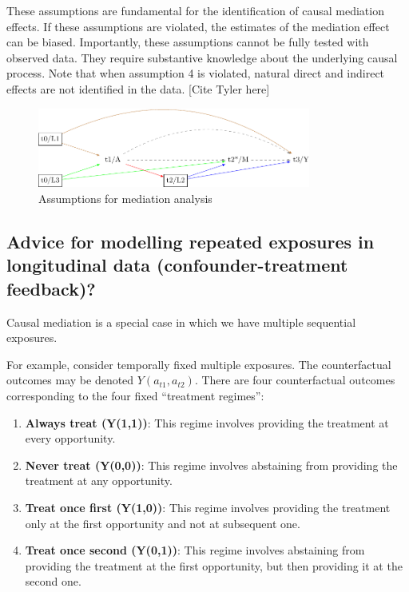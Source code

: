 \documentclass[
  singlecolumn]{report}
\begin{document}
These assumptions are fundamental for the identification of causal
mediation effects. If these assumptions are violated, the estimates of
the mediation effect can be biased. Importantly, these assumptions
cannot be fully tested with observed data. They require substantive
knowledge about the underlying causal process. Note that when assumption
4 is violated, natural direct and indirect effects are not identified in
the data. {[}Cite Tyler here{]}

\begin{figure}

{\centering \includegraphics[width=0.8\textwidth,height=\textheight]{causal-dags_files/figure-pdf/fig-dag-mediation-assuptions-1.pdf}

}

\caption{\label{fig-dag-mediation-assuptions}Assumptions for mediation
analysis}

\end{figure}

\hypertarget{advice-for-modelling-repeated-exposures-in-longitudinal-data-confounder-treatment-feedback}{%
\subsection{Advice for modelling repeated exposures in longitudinal data
(confounder-treatment
feedback)?}\label{advice-for-modelling-repeated-exposures-in-longitudinal-data-confounder-treatment-feedback}}

Causal mediation is a special case in which we have multiple sequential
exposures.

For example, consider temporally fixed multiple exposures. The
counterfactual outcomes may be denoted \(Y(a_{t1} ,a_{t2})\). There are
four counterfactual outcomes corresponding to the four fixed ``treatment
regimes'':

\begin{enumerate}
\def\labelenumi{\arabic{enumi}.}
\item
  \textbf{Always treat (Y(1,1))}: This regime involves providing the
  treatment at every opportunity.
\item
  \textbf{Never treat (Y(0,0))}: This regime involves abstaining from
  providing the treatment at any opportunity.
\item
  \textbf{Treat once first (Y(1,0))}: This regime involves providing the
  treatment only at the first opportunity and not at subsequent one.
\item
  \textbf{Treat once second (Y(0,1))}: This regime involves abstaining
  from providing the treatment at the first opportunity, but then
  providing it at the second one.
\end{enumerate}
\end{document}
